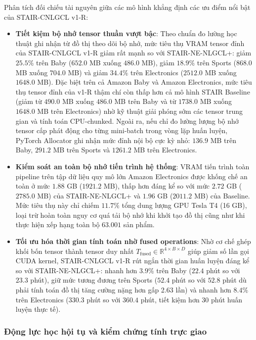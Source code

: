 Phân tích đối chiếu tài nguyên giữa các mô hình khẳng định các ưu điểm nổi bật của STAIR-CNLGCL v1-R:
\begin{itemize}[leftmargin=*]
    \item \textbf{Tiết kiệm bộ nhớ tensor thuần vượt bậc}: Theo chuẩn đo lường học thuật ghi nhận từ đồ thị theo dõi bộ nhớ, mức tiêu thụ VRAM tensor đỉnh của STAIR-CNLGCL v1-R giảm rất mạnh so với STAIR-NE-NLGCL+: giảm $25.5\%$ trên Baby ($652.0$ MB xuống $486.0$ MB), giảm $18.9\%$ trên Sports ($868.0$ MB xuống $704.0$ MB) và giảm $34.4\%$ trên Electronics ($2512.0$ MB xuống $1648.0$ MB). Đặc biệt trên cả Amazon Baby và Amazon Electronics, mức tiêu thụ tensor đỉnh của v1-R thậm chí còn thấp hơn cả mô hình STAIR Baseline (giảm từ $490.0$ MB xuống $486.0$ MB trên Baby và từ $1738.0$ MB xuống $1648.0$ MB trên Electronics) nhờ kỹ thuật giải phóng sớm các tensor trung gian và tính toán CPU-chunked. Ngoài ra, nếu chỉ đo lường lượng bộ nhớ tensor cấp phát động cho từng mini-batch trong vòng lặp huấn luyện, PyTorch Allocator ghi nhận mức đỉnh nội bộ cực kỳ nhỏ: $136.9$ MB trên Baby, $291.2$ MB trên Sports và $1261.2$ MB trên Electronics.
    \item \textbf{Kiểm soát an toàn bộ nhớ tiến trình hệ thống}: VRAM tiến trình toàn pipeline trên tập dữ liệu quy mô lớn Amazon Electronics được khống chế an toàn ở mức $1.88$ GB ($1921.2$ MB), thấp hơn đáng kể so với mức $2.72$ GB ($2785.0$ MB) của STAIR-NE-NLGCL+ và $1.96$ GB ($2011.2$ MB) của Baseline. Mức tiêu thụ này chỉ chiếm $11.7\%$ tổng dung lượng GPU Tesla T4 (16 GB), loại trừ hoàn toàn nguy cơ quá tải bộ nhớ khi khởi tạo đồ thị cũng như khi thực hiện xếp hạng toàn bộ $63.001$ sản phẩm.
    \item \textbf{Tối ưu hóa thời gian tính toán nhờ fused operations}: Nhờ cơ chế ghép khối bốn tensor thành tensor duy nhất $T_{\text{fused}} \in \mathbb{R}^{4 \times B \times D}$ giúp giảm số lần gọi CUDA kernel, STAIR-CNLGCL v1-R rút ngắn thời gian huấn luyện đáng kể so với STAIR-NE-NLGCL+: nhanh hơn $3.9\%$ trên Baby ($22.4$ phút so với $23.3$ phút), giữ mức tương đương trên Sports ($52.4$ phút so với $52.8$ phút dù phải tính toán đồ thị tăng cường nặng hơn gấp 2.63 lần) và nhanh hơn $8.4\%$ trên Electronics ($330.3$ phút so với $360.4$ phút, tiết kiệm hơn $30$ phút huấn luyện thực tế).
\end{itemize}

\subsubsection{Động lực học hội tụ và kiểm chứng tính trực giao}

